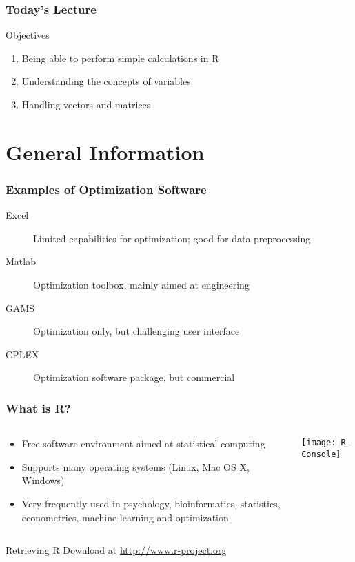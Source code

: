 \documentclass[%
  final,
  11pt, 
  show notes, %
  t, %
  fleqn, %
]{beamer}
\begin{document}
  
  
\begin{frame}
  \frametitle{Today's Lecture}
\vfill
\begin{block}{Objectives}
\begin{enumerate}
\item Being able to perform simple calculations in R
\item Understanding the concepts of variables
\item Handling vectors and matrices
\end{enumerate}
\end{block}
\vfill
\end{frame}
  
  

\section{General Information}

\begin{frame}
  \frametitle{Examples of Optimization Software}
\vfill
\begin{description}
  \item[Excel] Limited capabilities for optimization; good for data preprocessing
	\item[Matlab] Optimization toolbox, mainly aimed at engineering
  \item[GAMS] Optimization only, but challenging user interface
  \item[CPLEX] Optimization software package, but commercial
\end{description}
\vfill
\end{frame}

\begin{frame}
  \frametitle{What is R?}
\begin{columns}[c]
\begin{column}{.45\textwidth}
\begin{itemize}
\item Free software environment aimed at statistical computing
\item Supports many operating systems (Linux, Mac OS X, Windows)
\item Very frequently used in psychology, bioinformatics, statistics, econometrics, machine learning and optimization
\end{itemize}
\end{column}
\begin{column}{.5\textwidth}
\texttt{[image: R-Console]}
\end{column}
\end{columns}
\vfill
\begin{block}{Retrieving R}
Download at \url{http://www.r-project.org}
\end{block}
\vfill
\end{frame}
\end{document}
